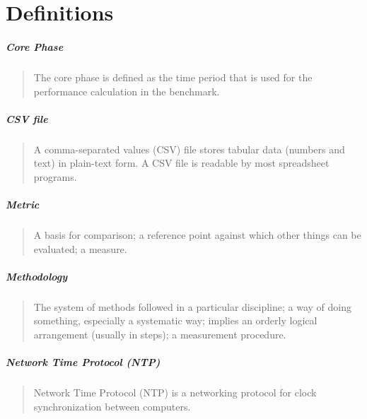 \chapter{Definitions}
\label{sec:definitions}

\setlength{\parskip}{1pt}
\paragraph*{Core Phase}
\begin{quote}
The core phase is defined as the time period that is used for the performance calculation in the benchmark.
\end{quote}

\paragraph*{CSV file}
\begin{quote}
A comma-separated values (CSV) file stores tabular data (numbers and text) in plain-text form.
A CSV file is readable by most spreadsheet programs.
\end{quote}

\paragraph*{Metric}
\begin{quote}
A basis for comparison; a reference point against which other things can be evaluated; a measure.
\end{quote}

\paragraph*{Methodology}
\begin{quote}
The system of methods followed in a particular discipline; a way of doing something, especially a systematic way; implies an orderly logical arrangement (usually in steps); a measurement procedure.
\end{quote}


\paragraph*{Network Time Protocol (NTP)}
\begin{quote}
Network Time Protocol (NTP) is a networking protocol for clock synchronization between computers.
\end{quote}


